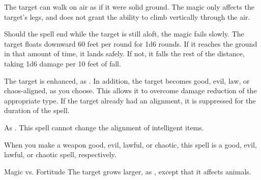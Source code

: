 \begin{spellheader}
\end{spellheader}
\begin{spelleffects}
    \spelleffect The target can walk on air as if it were solid ground. The magic only affects the target's legs, and does not grant the ability to climb vertically through the air.
    \par Should the spell end while the target is still aloft, the magic fails slowly. The target floats downward 60 feet per round for 1d6 rounds. If it reaches the ground in that amount of time, it lands safely. If not, it falls the rest of the distance, taking 1d6 damage per 10 feet of fall.
    \spelldur{\durshort}
\end{spelleffects}

\begin{spellheader}
    \spellrng{\rngclose}
\end{spellheader}
\begin{spelleffects}
    \spelleffect The target is enhanced, as . In addition, the target becomes good, evil, law, or chaos-aligned, as you choose. This allows it to overcome damage reduction of the appropriate type. If the target already had an alignment, it is suppressed for the duration of the spell.
\end{spelleffects}
\begin{spellfooter}
    \spellnotes As . This spell cannot change the alignment of intelligent items.

    When you make a weapon good, evil, lawful, or chaotic, this spell is a good, evil, lawful, or chaotic spell, respectively.
\end{spellfooter}

\begin{spellheader}
\end{spellheader}
\begin{spelleffects}
    \begin{spellattack}{Magic vs. Fortitude}
        \spellsuccess The target grows larger, as , except that it affects animals.
    \end{spellattack}
\end{spelleffects}

